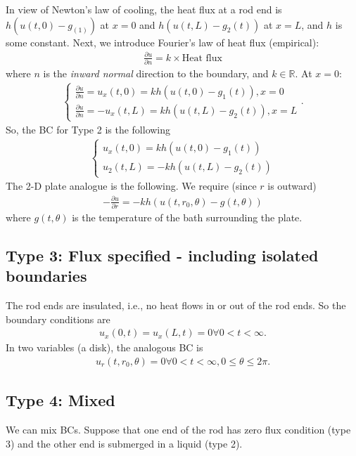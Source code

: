 \documentclass{article}
\theoremstyle{definition}
\newcommand{\p}{\partial}
\newcommand{\R}{\mathbb{R}}
\begin{document}
In view of Newton's law of cooling, the heat flux at a rod end is $h(u(t,0) - g_(1))$ at $x=0$ and $h(u(t,L)-g_2(t))$ at $x=L$, and $h$ is some constant. Next, we introduce Fourier's law of heat flux (empirical):
\begin{align*}
\frac{\p u}{\p n} = k \times\text{Heat flux}
\end{align*}
where $n$ is the \textit{inward normal} direction to the boundary, and $k\in\R$. At $x=0$:
\begin{align*}
\begin{cases*}
\frac{\p u}{\p n} = u_x(t,0) = kh(u(t,0)-g_1(t)), x=0\\
\frac{\p u}{\p n} = -u_x(t,L) = kh(u(t,L)-g_2(t)), x=L
\end{cases*}.
\end{align*}
So, the BC for Type 2 is the following
\begin{align*}
\begin{cases*}
u_x(t,0) = kh(u(t,0) - g_1(t))\\
u_2(t,L) = -kh(u(t,L) - g_2(t))
\end{cases*}
\end{align*}
The 2-D plate analogue is the following. We require (since $r$ is outward)
\begin{align*}
-\frac{\p u}{\p r} = -kh(u(t,r_0,\theta) - g(t,\theta))
\end{align*}
where $g(t,\theta)$ is the temperature of the bath surrounding the plate. 


\subsection{Type 3: Flux specified - including isolated boundaries} 
The rod ends are insulated, i.e., no heat flows in or out of the rod ends. So the boundary conditions are
\begin{align*}
u_x(0,t) = u_x(L,t) = 0 \forall 0 < t < \infty.
\end{align*}
In two variables (a disk), the analogous BC is
\begin{align*}
u_r(t,r_0,\theta) = 0 \forall 0 < t < \infty, 0\leq \theta \leq 2\pi.
\end{align*}
\subsection{Type 4: Mixed}
We can mix BCs. Suppose that one end of the rod has zero flux condition (type 3) and the other end is submerged in a liquid (type 2).
\end{document}

